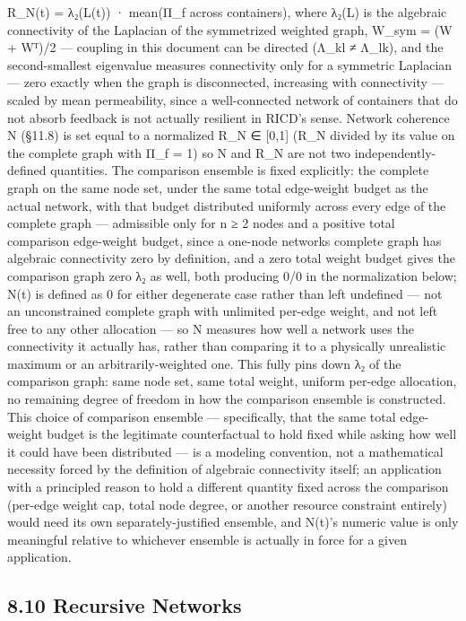 \documentclass[
]{article}
\begin{document}
R\_N(t) = λ₂(L(t)) · mean(Π\_f across containers), where λ₂(L) is the
algebraic connectivity of the Laplacian of the symmetrized weighted
graph, W\_sym = (W + Wᵀ)/2 --- coupling in this document can be directed
(Λ\_kl ≠ Λ\_lk), and the second-smallest eigenvalue measures
connectivity only for a symmetric Laplacian --- zero exactly when the
graph is disconnected, increasing with connectivity --- scaled by mean
permeability, since a well-connected network of containers that do not
absorb feedback is not actually resilient in RICD's sense. Network
coherence N (§11.8) is set equal to a normalized R\_N ∈ {[}0,1{]} (R\_N
divided by its value on the complete graph with Π\_f = 1) so N and R\_N
are not two independently-defined quantities. The comparison ensemble is
fixed explicitly: the complete graph on the same node set, under the
same total edge-weight budget as the actual network, with that budget
distributed uniformly across every edge of the complete graph ---
admissible only for n ≥ 2 nodes and a positive total comparison
edge-weight budget, since a one-node networks complete graph has
algebraic connectivity zero by definition, and a zero total weight
budget gives the comparison graph zero λ₂ as well, both producing 0/0 in
the normalization below; N(t) is defined as 0 for either degenerate case
rather than left undefined --- not an unconstrained complete graph with
unlimited per-edge weight, and not left free to any other allocation ---
so N measures how well a network uses the connectivity it actually has,
rather than comparing it to a physically unrealistic maximum or an
arbitrarily-weighted one. This fully pins down λ₂ of the comparison
graph: same node set, same total weight, uniform per-edge allocation, no
remaining degree of freedom in how the comparison ensemble is
constructed. This choice of comparison ensemble --- specifically, that
the same total edge-weight budget is the legitimate counterfactual to
hold fixed while asking how well it could have been distributed --- is a
modeling convention, not a mathematical necessity forced by the
definition of algebraic connectivity itself; an application with a
principled reason to hold a different quantity fixed across the
comparison (per-edge weight cap, total node degree, or another resource
constraint entirely) would need its own separately-justified ensemble,
and N(t)'s numeric value is only meaningful relative to whichever
ensemble is actually in force for a given application.

\hypertarget{recursive-networks}{%
\subsection{8.10 Recursive Networks}\label{recursive-networks}}
\end{document}
